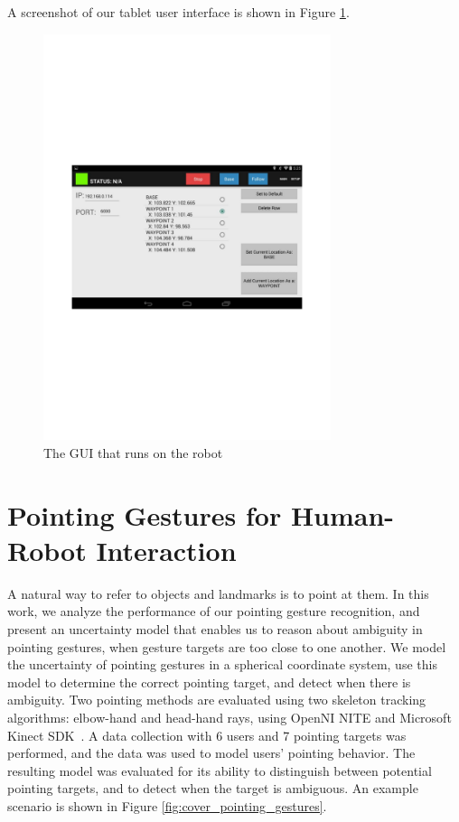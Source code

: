 A screenshot of our tablet user interface is shown in Figure \ref{fig:ui}.

\begin{figure}[ht!]
\centering
\includegraphics[width=0.75\textwidth]{pics/ui}
\caption{The GUI that runs on the robot}
\label{fig:ui}
\end{figure}

\section{Pointing Gestures for Human-Robot Interaction}
\label{sec:pointing_gestures}

A natural way to refer to objects and landmarks is to point at them. In this work, we analyze the performance of our pointing gesture recognition, and present an uncertainty model that enables us to reason about ambiguity in pointing gestures, when gesture targets are too close to one another. We model the uncertainty of pointing gestures in a spherical coordinate system, use this model to determine the correct pointing target, and detect when there is ambiguity. Two pointing methods are evaluated using two skeleton tracking algorithms: elbow-hand and head-hand rays, using OpenNI NITE and Microsoft Kinect SDK~\cite{shotton2011real}.  A data collection with 6 users and 7 pointing targets was performed, and the data was used to model users' pointing behavior.  The resulting model was evaluated for its ability to distinguish between potential pointing targets, and to detect when the target is ambiguous.  An example scenario is shown in Figure \ref{fig:cover_pointing_gestures}.

